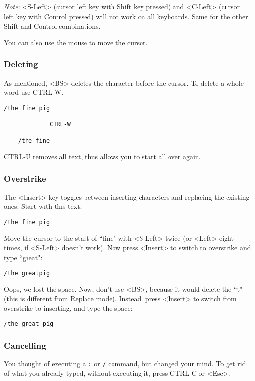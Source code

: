 \emph{Note}:
<S-Left> (cursor left key with Shift key pressed) and <C-Left> (cursor left key with Control pressed) will not work on all keyboards.
Same for the other Shift and Control combinations.

You can also use the mouse to move the cursor.
\subsubsection{Deleting}
As mentioned, <BS> deletes the character before the cursor.  To delete a whole
word use CTRL-W.

\begin{Verbatim}[samepage=true]
    /the fine pig 

             CTRL-W

    /the fine 
\end{Verbatim}

CTRL-U removes all text, thus allows you to start all over again.
\subsubsection{Overstrike}
The <Insert> key toggles between inserting characters and replacing the existing ones.
Start with this text:

\begin{Verbatim}[samepage=true]
    /the fine pig 
\end{Verbatim}

Move the cursor to the start of ``fine" with <S-Left> twice (or <Left> eight times, if <S-Left> doesn't work).
Now press <Insert> to switch to overstrike and type ``great":

\begin{Verbatim}[samepage=true]
    /the greatpig 
\end{Verbatim}

Oops, we lost the space.
Now, don't use <BS>, because it would delete the ``t" (this is different from Replace mode).
Instead, press <Insert> to switch from overstrike to inserting, and type the space:

\begin{Verbatim}[samepage=true]
    /the great pig 
\end{Verbatim}

\subsubsection{Cancelling}
You thought of executing a \texttt{:} or \texttt{/} command, but changed your mind.
To get rid of what you already typed, without executing it, press CTRL-C or <Esc>.

